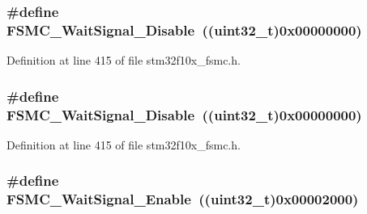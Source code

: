 \subsubsection[{\texorpdfstring{F\+S\+M\+C\+\_\+\+Wait\+Signal\+\_\+\+Disable}{FSMC_WaitSignal_Disable}}]{\setlength{\rightskip}{0pt plus 5cm}\#define F\+S\+M\+C\+\_\+\+Wait\+Signal\+\_\+\+Disable~(({\bf uint32\+\_\+t})0x00000000)}\hypertarget{group___f_s_m_c___wait___signal_ga6ea66c8ddee073281c421533bdff7e19}{}\label{group___f_s_m_c___wait___signal_ga6ea66c8ddee073281c421533bdff7e19}


Definition at line 415 of file stm32f10x\+\_\+fsmc.\+h.

\subsubsection[{\texorpdfstring{F\+S\+M\+C\+\_\+\+Wait\+Signal\+\_\+\+Disable}{FSMC_WaitSignal_Disable}}]{\setlength{\rightskip}{0pt plus 5cm}\#define F\+S\+M\+C\+\_\+\+Wait\+Signal\+\_\+\+Disable~(({\bf uint32\+\_\+t})0x00000000)}\hypertarget{group___f_s_m_c___wait___signal_ga6ea66c8ddee073281c421533bdff7e19}{}\label{group___f_s_m_c___wait___signal_ga6ea66c8ddee073281c421533bdff7e19}


Definition at line 415 of file stm32f10x\+\_\+fsmc.\+h.

\subsubsection[{\texorpdfstring{F\+S\+M\+C\+\_\+\+Wait\+Signal\+\_\+\+Enable}{FSMC_WaitSignal_Enable}}]{\setlength{\rightskip}{0pt plus 5cm}\#define F\+S\+M\+C\+\_\+\+Wait\+Signal\+\_\+\+Enable~(({\bf uint32\+\_\+t})0x00002000)}\hypertarget{group___f_s_m_c___wait___signal_gaf809e339f1cdc9d0a815fd98712e9ee3}{}\label{group___f_s_m_c___wait___signal_gaf809e339f1cdc9d0a815fd98712e9ee3}


